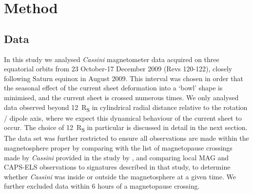 \section{Method}\label{equinox:sec:method}
\subsection{Data}
In this study we analysed \textit{Cassini} magnetometer data acquired on three equatorial orbits from 23 October{\--}17 December 2009 (Revs 120{\--}122), closely following Saturn equinox in August 2009. This interval was chosen in order that the seasonal effect of the current sheet deformation into a `bowl' shape \citep[e.g.][]{arridge2008warp} is minimised, and the current sheet is crossed numerous times. We only analysed data observed beyond \SI{12}{R_S} in cylindrical radial distance relative to the rotation / dipole axis, where we expect this dynamical behaviour of the current sheet to occur. The choice of \SI{12}{R_S} in particular is discussed in detail in the next section. The data set was further restricted to ensure all observations are made within the magnetosphere proper by comparing with the list of magnetopause crossings made by \textit{Cassini} provided in the study by \citet{pilkington2015}, and comparing local MAG and CAPS-ELS observations to signatures described in that study, to determine whether \textit{Cassini} was inside or outside the magnetosphere at a given time. We further excluded data within 6 hours of a magnetopause crossing.

